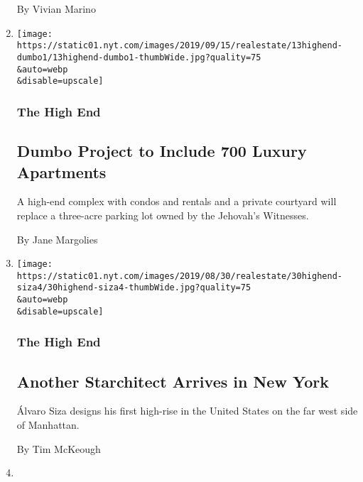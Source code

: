 \begin{enumerate}
  By Vivian Marino
\item
  \href{/2019/09/13/realestate/dumbo-brooklyn-condos-on-former-jehovahs-witness-parking-lot.html}{}

  \texttt{[image: https://static01.nyt.com/images/2019/09/15/realestate/13highend-dumbo1/13highend-dumbo1-thumbWide.jpg?quality=75\\\&auto=webp\\\&disable=upscale]}

  \hypertarget{the-high-end-4}{%
  \subsubsection{The High End}\label{the-high-end-4}}

  \hypertarget{dumbo-project-to-include-700-luxury-apartments-1}{%
  \subsection{Dumbo Project to Include 700 Luxury
  Apartments}\label{dumbo-project-to-include-700-luxury-apartments-1}}

  A high-end complex with condos and rentals and a private courtyard
  will replace a three-acre parking lot owned by the Jehovah's
  Witnesses.

  By Jane Margolies
\item
  \href{/2019/08/30/realestate/another-starchitect-arrives-in-new-york.html}{}

  \texttt{[image: https://static01.nyt.com/images/2019/08/30/realestate/30highend-siza4/30highend-siza4-thumbWide.jpg?quality=75\\\&auto=webp\\\&disable=upscale]}

  \hypertarget{the-high-end-5}{%
  \subsubsection{The High End}\label{the-high-end-5}}

  \hypertarget{another-starchitect-arrives-in-new-york-1}{%
  \subsection{Another Starchitect Arrives in New
  York}\label{another-starchitect-arrives-in-new-york-1}}

  Álvaro Siza designs his first high-rise in the United States on the
  far west side of Manhattan.

  By Tim McKeough
\item
  \href{/2019/08/09/realestate/now-crown-heights-gets-a-taste-of-luxury.html}{}


\end{enumerate}
